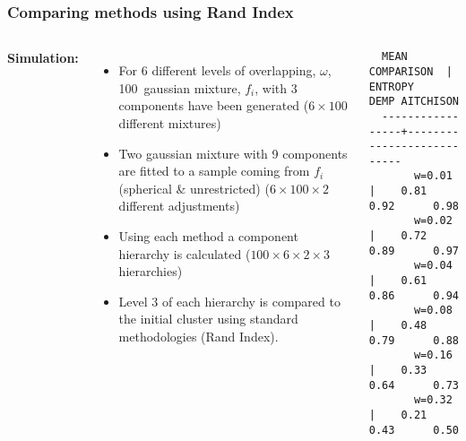 \begin{frame}[fragile]
\frametitle{Comparing methods using Rand Index}
\centering
\begin{columns}[T]

\scriptsize

\textbf{Simulation:}

\begin{itemize}
\item For $6$ different levels of overlapping, $\omega$, 100~gaussian mixture, $f_i$,  with $3$ components have been generated ($6 \times 100$ different mixtures)
\item Two gaussian mixture with 9 components are fitted to a sample coming from $f_i$ (spherical \& unrestricted) ($6 \times 100 \times 2$ different adjustments)
\item Using each method a component hierarchy is calculated ($100 \times 6 \times 2 \times 3$  hierarchies)
\item Level $3$ of each hierarchy is compared to the initial cluster using standard methodologies (Rand Index).
\end{itemize}
\begin{center}
\pause

\begin{verbatim}
  MEAN COMPARISON  | ENTROPY     DEMP AITCHISON
  -----------------+---------------------------
       w=0.01      |    0.81     0.92      0.98
       w=0.02      |    0.72     0.89      0.97
       w=0.04      |    0.61     0.86      0.94
       w=0.08      |    0.48     0.79      0.88
       w=0.16      |    0.33     0.64      0.73
       w=0.32      |    0.21     0.43      0.50
\end{verbatim}
\end{center}
\end{columns}

\end{frame}
